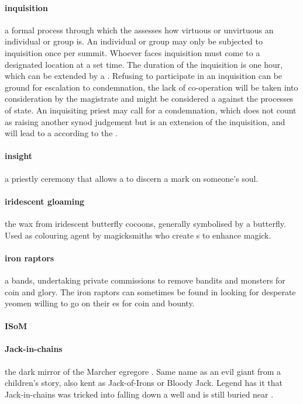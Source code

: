 \paragraph{inquisition} a formal process through which the  assesses how virtuous or unvirtuous an individual or group is. An individual or group may only be subjected to inquisition once per summit. Whoever faces inquisition must come to a designated location at a set time. The duration of the inquisition is one hour, which can be extended by a . Refusing to participate in an inquisition can be ground for escalation to condemnation, the lack of co-operation will be taken into consideration by the magistrate and might be considered a  against the processes of state. An inquisiting priest may call for a condemnation, which does not count as raising another synod judgement but is an extension of the inquisition, and will lead to a  according to the .
\paragraph{insight} a priestly ceremony that allows a  to discern a mark on someone's soul.
\paragraph{iridescent gloaming} the wax from iridescent butterfly cocoons, generally symbolised by a butterfly. Used as colouring agent by magicksmiths who create s to enhance magick.
\paragraph{iron raptors} a  bands, undertaking private commissions to remove bandits and monsters for coin and glory. The iron raptors can sometimes be found in  looking for desperate yeomen willing to go on their es for coin and bounty.
\paragraph{ISoM} 
\paragraph{Jack-in-chains} the dark mirror of the Marcher egregore . Same name as an evil giant from a children's story, also kent as Jack-of-Irons or Bloody Jack. Legend has it that Jack-in-chains was tricked into falling down a well and is still buried near .
